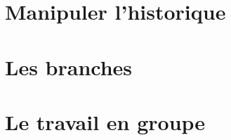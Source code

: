 \documentclass{beamer}
\begin{document}
  \section{Manipuler l'historique}
  \section{Les branches}
  \section{Le travail en groupe}


\end{document}
